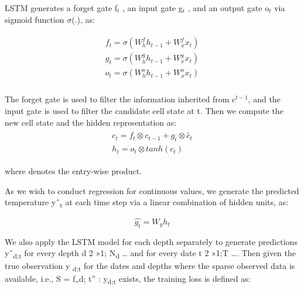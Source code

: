 \documentclass[book.tex]{subfiles}
\begin{document}
% 
% 


LSTM generates a forget gate f$_t$ , an input gate
g$_t$ , and an output gate o$_t$ via sigmoid
function $\sigma$(.), as:


\begin{align}
\begin{split}
  f_t = \sigma(W_h^f h_{t-1} + W_x^f x_t)\\
  g_t = \sigma(W_h^g h_{t-1} + W_x^g x_t)\\
  o_t = \sigma(W_h^o h_{t-1} + W_x^o x_t)\\
\end{split}
\end{align}
  
 
The forget gate is used to filter the information inherited from c$^{t-1}$, and the input gate is used to
filter the candidate
cell state at t. Then we compute the new cell state and the hidden
representation as: 
\begin{align}
    \begin{split}
        c_t=f_t \otimes c_{t-1}+g_t\otimes \tilde{c_t}\\
        h_t=o_t \otimes tanh(c_t)
    \end{split}
\end{align}


where denotes the entry-wise product.

As we wish to conduct regression for continuous values, we generate the
predicted temperature yˆ\textsubscript{t} at each time step via a linear combination of hidden units, as:

\begin{equation}
    \hat{y_t}=W_y h_t
\end{equation}


We also apply the LSTM model for each depth separately to generate
predictions yˆ\textsubscript{d;t} for every depth d 2 »1;
N\textsubscript{d} \ldots{} and for every date t 2 »1;T \ldots{}. Then
given the true observation y \textsubscript{d;t} for the dates and
depths where the sparse observed data is available, i.e., S = f„d; t'' :
y\textsubscript{d;t} exists, the training loss is defined as:
\end{document}
